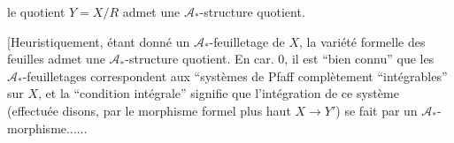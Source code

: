 le quotient  $Y=X/R$ admet une $\mathcal A_*$-structure quotient.

[Heuristiquement, étant donné un $\mathcal A_*$-feuilletage de $X$, la variété formelle des feuilles admet une $\mathcal A_*$-structure quotient. En car. 0, il est ``bien connu'' que les $\mathcal A_*$-feuilletages correspondent aux ``systèmes de Pfaff complètement ``intégrables'' sur $X$, et la ``condition intégrale'' signifie que l'intégration de ce système (effectuée disons, par le morphisme formel plus haut $X\to Y'$) se fait par un $\mathcal A_*$-morphisme$\ldots\ldots$
